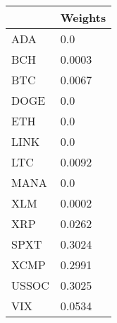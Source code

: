 \begin{tabular}{ll}
\toprule
 & Weights \\
\midrule
ADA & 0.0 \\
BCH & 0.0003 \\
BTC & 0.0067 \\
DOGE & 0.0 \\
ETH & 0.0 \\
LINK & 0.0 \\
LTC & 0.0092 \\
MANA & 0.0 \\
XLM & 0.0002 \\
XRP & 0.0262 \\
SPXT & 0.3024 \\
XCMP & 0.2991 \\
USSOC & 0.3025 \\
VIX & 0.0534 \\
\bottomrule
\end{tabular}
